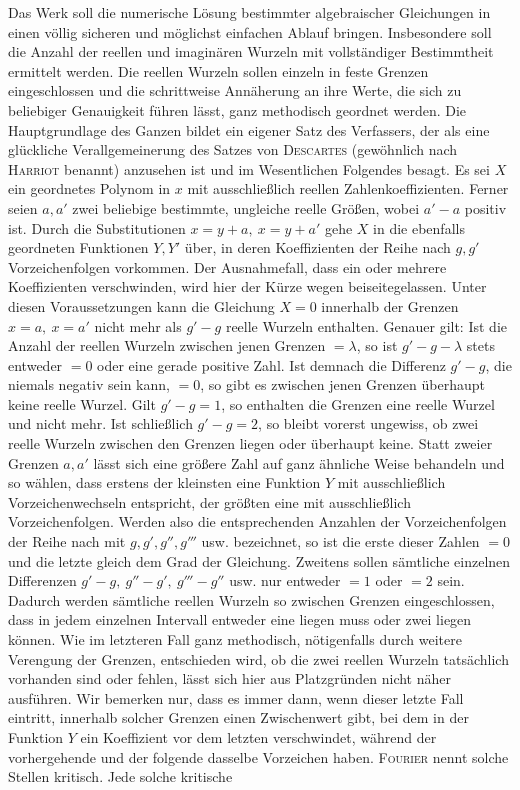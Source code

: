 Das Werk soll die numerische Lösung bestimmter algebraischer Gleichungen in einen völlig sicheren und möglichst einfachen Ablauf bringen. Insbesondere soll die Anzahl der reellen und imaginären Wurzeln mit vollständiger Bestimmtheit ermittelt werden. Die reellen Wurzeln sollen einzeln in feste Grenzen eingeschlossen und die schrittweise Annäherung an ihre Werte, die sich zu beliebiger Genauigkeit führen lässt, ganz methodisch geordnet werden. Die Hauptgrundlage des Ganzen bildet ein eigener Satz des Verfassers,
der als eine glückliche Verallgemeinerung des Satzes von \textsc{Descartes} (gewöhnlich nach \textsc{Harriot} benannt) anzusehen ist und im Wesentlichen Folgendes besagt. Es sei $X$ ein geordnetes Polynom in $x$ mit ausschließlich reellen Zahlenkoeffizienten. Ferner seien $a,a'$ zwei beliebige bestimmte, ungleiche reelle Größen, wobei $a'-a$ positiv ist. Durch die Substitutionen $x=y+a,\ x=y+a'$ gehe $X$ in die ebenfalls geordneten Funktionen $Y,Y'$ über, in deren Koeffizienten der Reihe nach $g,g'$ Vorzeichenfolgen vorkommen. Der Ausnahmefall, dass ein oder mehrere Koeffizienten verschwinden, wird hier der Kürze wegen beiseitegelassen. Unter diesen Voraussetzungen kann die Gleichung $X=0$ innerhalb der Grenzen $x=a,\ x=a'$ nicht mehr als $g'-g$ reelle Wurzeln enthalten. Genauer gilt: Ist die Anzahl der reellen Wurzeln zwischen jenen Grenzen $=\lambda$, so ist $g'-g-\lambda$ stets entweder $=0$ oder eine gerade positive Zahl. Ist demnach die Differenz $g'-g$, die niemals negativ sein kann, $=0$, so gibt es zwischen jenen Grenzen überhaupt keine reelle Wurzel. Gilt $g'-g=1$, so enthalten die Grenzen eine reelle Wurzel und nicht mehr. Ist schließlich $g'-g=2$, so bleibt vorerst ungewiss, ob zwei reelle Wurzeln zwischen den Grenzen liegen oder überhaupt keine. Statt zweier Grenzen $a,a'$ lässt sich eine größere Zahl auf ganz ähnliche Weise behandeln und so wählen, dass erstens der kleinsten eine Funktion $Y$ mit ausschließlich Vorzeichenwechseln entspricht, der größten eine mit ausschließlich Vorzeichenfolgen. Werden also die entsprechenden Anzahlen der Vorzeichenfolgen der Reihe nach mit $g,g',g'',g'''$ usw. bezeichnet, so ist die erste dieser Zahlen $=0$ und die letzte gleich dem Grad der Gleichung. Zweitens sollen sämtliche einzelnen Differenzen $g'-g,\ g''-g',\ g'''-g''$ usw. nur entweder $=1$ oder $=2$ sein. Dadurch werden sämtliche reellen Wurzeln so zwischen Grenzen eingeschlossen, dass in jedem einzelnen Intervall entweder eine liegen muss oder zwei liegen können. Wie im letzteren Fall ganz methodisch, nötigenfalls durch weitere Verengung der Grenzen, entschieden wird, ob die zwei reellen Wurzeln tatsächlich vorhanden sind oder fehlen, lässt sich hier aus Platzgründen nicht näher ausführen. Wir bemerken nur, dass es immer dann, wenn dieser letzte Fall eintritt, innerhalb solcher Grenzen einen Zwischenwert gibt, bei dem in der Funktion $Y$ ein Koeffizient vor dem letzten verschwindet, während der vorhergehende und der folgende dasselbe Vorzeichen haben. \textsc{Fourier} nennt solche Stellen kritisch. Jede solche kritische
